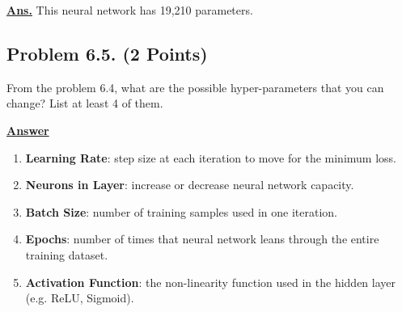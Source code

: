 \documentclass[12pt, a4paper]{article}
\begin{document}
            \noindent \underline{\textbf{Ans.}} This neural network has 19,210 parameters.

	\pagebreak

        \subsection{Problem 6.5. (2 Points)}
            From the problem 6.4, what are the possible hyper-parameters that you can change?
            List at least 4 of them.

            \vspace{1em}

            \noindent \underline{\textbf{Answer}}

            \begin{enumerate}
                \item \textbf{Learning Rate}: step size at each iteration to move for the minimum loss.
                \item \textbf{Neurons in Layer}: increase or decrease neural network capacity.
                \item \textbf{Batch Size}: number of training samples used in one iteration.
                \item \textbf{Epochs}: number of times that neural network leans through the entire training dataset.
                \item \textbf{Activation Function}: the non-linearity function used in the hidden layer (e.g. ReLU, Sigmoid).
            \end{enumerate}
\end{document}
